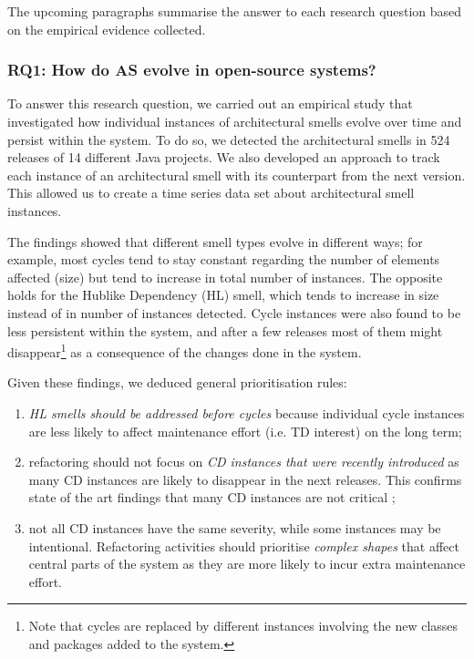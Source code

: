 The upcoming paragraphs summarise the answer to each research question based on the empirical evidence collected.

\subsubsection*{RQ1: How do AS evolve in open-source systems?}
To answer this research question, we carried out an empirical study that investigated how individual instances of architectural smells evolve over time and persist within the system.
To do so, we detected the architectural smells in 524 releases of 14 different Java projects. 
We also developed an approach to track each instance of an architectural smell with its counterpart from the next version.
This allowed us to create a time series data set about architectural smell instances.

The findings showed that different smell types evolve in different ways; for example, most cycles tend to stay constant regarding the number of elements affected (size) but tend to increase in total number of instances.
The opposite holds for the Hublike Dependency (HL) smell, which tends to increase in size instead of in number of instances detected.
Cycle instances were also found to be less persistent within the system, and after a few releases most of them might disappear\footnote{Note that cycles are replaced by different instances involving the new classes and packages added to the system.} as a consequence of the changes done in the system.

Given these findings, we deduced general prioritisation rules:
\begin{enumerate}
\item \emph{HL smells should be addressed before cycles} because individual cycle instances are less likely to affect maintenance effort (i.e. TD interest) on the long term;
\item refactoring should not focus on \emph{CD instances that were recently introduced} as many CD instances are likely to disappear in the next releases. This confirms state of the art findings that many CD instances are not critical \cite{AlMutawa2014};
\item not all CD instances have the same severity, while some instances may be intentional. Refactoring activities should prioritise \emph{complex shapes} that affect central parts of the system as they are more likely to incur extra maintenance effort.
\end{enumerate}

